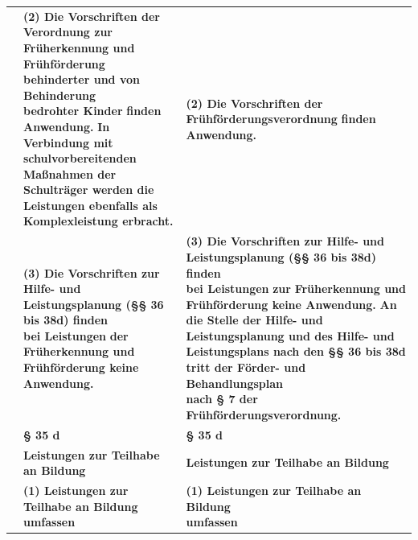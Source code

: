 \documentclass[10pt,a4paper,landscape]{article}
\begin{document}
\begin{longtable}{|L{8.2cm}|L{8.2cm}|L{8.2cm}|}
\hhline{|---|}
 & \textbf{(2) Die Vorschriften der }\textbf{\textcolor{diffred}{Verordnung zur  \newline Früherkennung und Frühförderung  \newline behinderter und von Behinderung  \newline bedrohter Kinder}}\textbf{ finden Anwendung. }\textbf{\textcolor{diffred}{In  \newline Verbindung mit schulvorbereitenden  \newline Maßnahmen der Schulträger werden die  \newline Leistungen ebenfalls als  \newline Komplexleistung erbracht.}} & \textbf{(2) Die Vorschriften der} \newline \textbf{\textcolor{diffgreen}{Frühförderungsverordnung}}\textbf{ finden  \newline Anwendung.  } \\
\hhline{|---|}
 & \textbf{(3) Die Vorschriften zur Hilfe- und  \newline Leistungsplanung (\S{}\S{} 36 bis 38d) finden  \newline bei Leistungen }\textbf{\textcolor{diffred}{der}}\textbf{ Früherkennung und  \newline Frühförderung keine Anwendung. } & \textbf{(3) Die Vorschriften zur Hilfe- und  \newline Leistungsplanung (\S{}\S{} 36 bis 38d) finden  \newline bei Leistungen }\textbf{\textcolor{diffgreen}{zur}}\textbf{ Früherkennung und  \newline Frühförderung keine Anwendung. }\textbf{\textcolor{diffgreen}{An }} \textbf{\textcolor{diffgreen}{die Stelle der Hilfe- und  \newline Leistungsplanung und des Hilfe- und  \newline Leistungsplans nach den \S{}\S{} 36 bis 38d  \newline tritt der Förder- und Behandlungsplan  \newline nach \S{} 7 der  \newline Frühförderungsverordnung.}} \\
\hhline{|---|}
 & \textbf{\S{} 35 d } & \textbf{\S{} 35 d } \\
\hhline{|---|}
 & \textbf{Leistungen zur Teilhabe an Bildung} & \textbf{Leistungen zur Teilhabe an Bildung} \\
\hhline{|---|}
 & \textbf{(1) Leistungen zur Teilhabe an Bildung  \newline umfassen } & \textbf{(1) Leistungen zur Teilhabe an Bildung  \newline umfassen } \\

\end{longtable}
\end{document}
